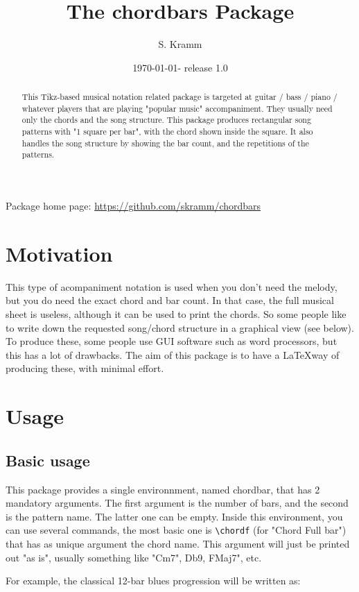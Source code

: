 \documentclass[11pt]{article}
\title{The chordbars Package}
\author{S. Kramm}
\date{\today - release 1.0}
\begin{document}
\maketitle

\begin{abstract}
This Tikz-based musical notation related package is targeted at guitar / bass / piano / whatever players that are playing "popular music" accompaniment.
They usually need only the chords and the song structure.
This package produces rectangular song patterns with "1 square per bar", with the chord shown inside the square.
It also handles the song structure by showing the bar count, and the repetitions of the patterns.
\end{abstract}

Package home page: \url{https://github.com/skramm/chordbars}

\section{Motivation}

This type of acompaniment notation is used when you don't need the melody, but you do need the exact chord and bar count.
In that case, the full musical sheet is useless, although it can be used to print the chords.
So some people like to write down the requested song/chord structure in a graphical view (see below).
To produce these, some people use GUI software such as word processors, but this has a lot of drawbacks.
The aim of this package is to have a \LaTeX way of producing these, with minimal effort.


\section{Usage}
\subsection{Basic usage}
This package provides a single environnment, named {\ttfamily chordbar}, that has 2 mandatory arguments.
The first argument is the number of bars, and the second is the pattern name.
The latter one can be empty.
Inside this environment, you can use several commands, the most basic one is 
\verb|\chordf| (for "Chord Full bar") that has as unique argument the chord name.
This argument will just be printed out "as is", usually something like "Cm7", Db9, FMaj7", etc.

For example, the classical 12-bar blues progression will be written as:
\end{document}
